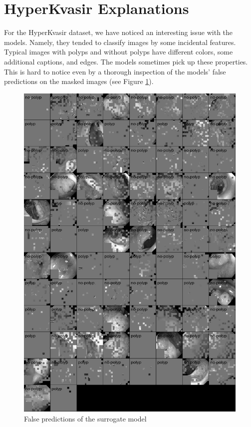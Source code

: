 \documentclass[en]{pracamgr}
\begin{document}
\section{HyperKvasir Explanations}\label{s:HyperKvasir Explanations}

For the HyperKvasir dataset, we have noticed an interesting issue with the models. Namely, they tended to classify images by some incidental features. Typical images with polyps and without polyps have different colors, some additional captions, and edges. The models sometimes pick up these properties. This is hard to notice even by a thorough inspection of the models' false predictions on the masked images (see Figure \ref{gastro_vit_masked}).

\begin{figure}[H]
\centering
\includegraphics[scale=0.4]{./images/gastro_false_surrogate.png}
\caption{False predictions of the surrogate model}
\label{gastro_vit_masked}
\end{figure}
\end{document}
